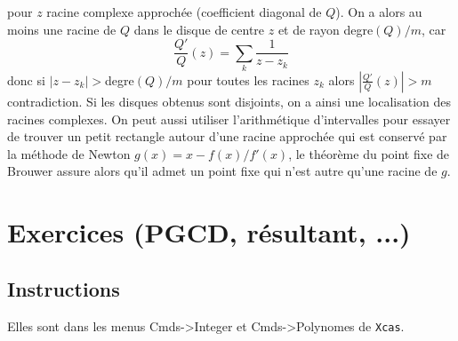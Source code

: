\documentclass[a4paper,11pt]{article}
\begin{document}
\begin{itemize}
pour $z$ racine complexe approch\'ee (coefficient
diagonal de $Q$). On a alors au moins
une racine de $Q$ dans le disque de centre $z$ 
et de rayon degre$(Q)/m$, car
\[ \frac{Q'}{Q}(z)= \sum_{k} \frac{1}{z-z_k}\]
donc si $|z-z_k| > $degre$(Q)/m$ pour toutes les racines $z_k$ alors
$|\frac{Q'}{Q}(z)| > m$ contradiction. Si les disques obtenus sont
disjoints, on a ainsi une localisation des racines complexes.
On peut aussi utiliser l'arithmétique d'intervalles pour
essayer de trouver un petit rectangle autour d'une racine approchée
qui est conservé par la méthode de Newton $g(x)=x-f(x)/f'(x)$,
le théorème du point fixe de Brouwer assure alors qu'il admet
un point fixe qui n'est autre qu'une racine de $g$.
\end{itemize}

\pagebreak

\section{Exercices (PGCD, r\'esultant, ...)}

\subsection{Instructions}
Elles sont dans les menus
Cmds->Integer et Cmds->Polynomes de \verb|Xcas|.
\end{document}
